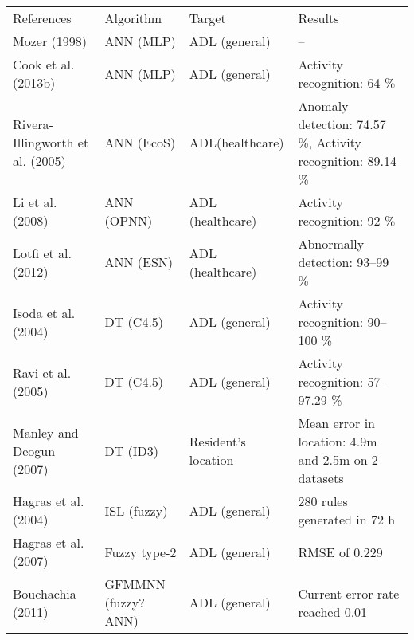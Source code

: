 \begin{table}[]
\begin{tabular}{llll}
References                       & Algorithm                  & Target              & Results                                                                                        \\
Mozer (1998)                     & ANN (MLP)                  & ADL (general)       & –                                                                                              \\
Cook et al. (2013b)              & ANN (MLP)                  & ADL (general)       & Activity recognition: 64 \%                                                                    \\
Rivera-Illingworth et al. (2005) & ANN (EcoS)                 & ADL(healthcare)     & Anomaly detection: 74.57 \%, Activity recognition: 89.14 \%                                    \\
Li et al. (2008)                 & ANN (OPNN)                 & ADL (healthcare)    & Activity recognition: 92 \%                                                                    \\
Lotfi et al. (2012)              & ANN (ESN)                  & ADL (healthcare)    & Abnormally detection: 93–99 \%                                                                 \\
Isoda et al. (2004)              & DT (C4.5)                  & ADL (general)       & Activity recognition: 90–100 \%                                                                \\
Ravi et al. (2005)               & DT (C4.5)                  & ADL (general)       & Activity recognition: 57–97.29 \%                                                              \\
Manley and Deogun (2007)         & DT (ID3)                   & Resident’s location & Mean error in location: 4.9m and 2.5m on 2 datasets                                            \\
Hagras et al. (2004)             & ISL (fuzzy)                & ADL (general)       & 280 rules generated in 72 h                                                                    \\
Hagras et al. (2007)             & Fuzzy type-2               & ADL (general)       & RMSE of 0.229                                                                                  \\
Bouchachia (2011)                & GFMMNN (fuzzy?ANN)         & ADL (general)       & Current error rate reached 0.01                                                                \\

\end{tabular}
\end{table}
